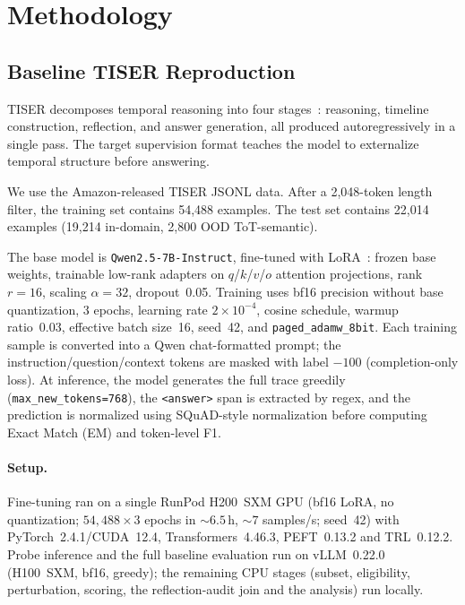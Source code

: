 \documentclass[conference]{IEEEtran}
\begin{document}
\section{Methodology}
\label{sec:methodology}

\subsection{Baseline TISER Reproduction}

TISER decomposes temporal reasoning into four stages~\cite{bazaga2025tiser}: reasoning, timeline construction, reflection, and answer generation, all produced autoregressively in a single pass. The target supervision format teaches the model to externalize temporal structure before answering.

We use the Amazon-released TISER JSONL data. After a 2,048-token length filter, the training set contains 54,488 examples. The test set contains 22,014 examples (19,214 in-domain, 2,800 OOD ToT-semantic).

The base model is \texttt{Qwen2.5-7B-Instruct}, fine-tuned with LoRA~\cite{hu2022lora}: frozen base weights, trainable low-rank adapters on $q$/$k$/$v$/$o$ attention projections, rank $r{=}16$, scaling $\alpha{=}32$, dropout~0.05. Training uses bf16 precision without base quantization, 3 epochs, learning rate $2{\times}10^{-4}$, cosine schedule, warmup ratio~0.03, effective batch size~16, seed~42, and \texttt{paged\_adamw\_8bit}. Each training sample is converted into a Qwen chat-formatted prompt; the instruction/question/context tokens are masked with label $-100$ (completion-only loss). At inference, the model generates the full trace greedily (\texttt{max\_new\_tokens=768}), the \texttt{<answer>} span is extracted by regex, and the prediction is normalized using SQuAD-style normalization before computing Exact Match (EM) and token-level F1.

\paragraph{Setup.}
Fine-tuning ran on a single RunPod H200~SXM GPU (bf16 LoRA, no quantization; $54{,}488{\times}3$ epochs in ${\sim}6.5$\,h, ${\sim}7$ samples/s; seed~42) with PyTorch~2.4.1/CUDA~12.4, Transformers~4.46.3, PEFT~0.13.2 and TRL~0.12.2. Probe inference and the full baseline evaluation run on vLLM~0.22.0 (H100~SXM, bf16, greedy); the remaining CPU stages (subset, eligibility, perturbation, scoring, the reflection-audit join and the analysis) run locally.
\end{document}
